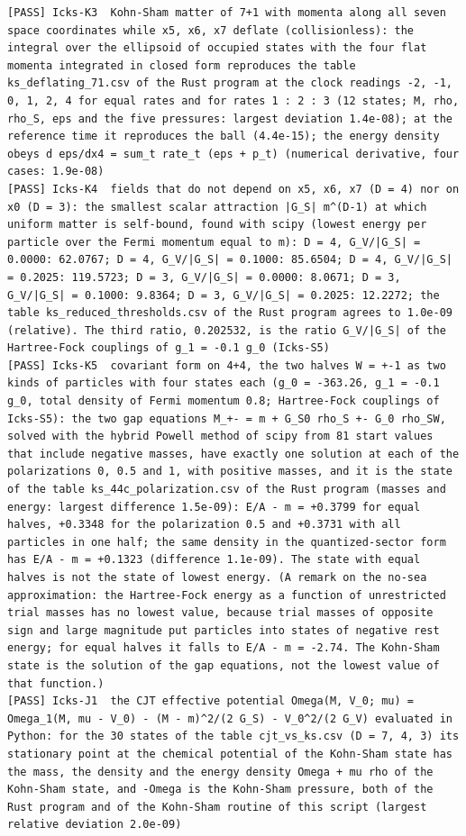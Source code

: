 \documentclass[
  10pt,
]{article}
\begin{document}
\begin{verbatim}
[PASS] Icks-K3  Kohn-Sham matter of 7+1 with momenta along all seven space coordinates while x5, x6, x7 deflate (collisionless): the integral over the ellipsoid of occupied states with the four flat momenta integrated in closed form reproduces the table ks_deflating_71.csv of the Rust program at the clock readings -2, -1, 0, 1, 2, 4 for equal rates and for rates 1 : 2 : 3 (12 states; M, rho, rho_S, eps and the five pressures: largest deviation 1.4e-08); at the reference time it reproduces the ball (4.4e-15); the energy density obeys d eps/dx4 = sum_t rate_t (eps + p_t) (numerical derivative, four cases: 1.9e-08)
[PASS] Icks-K4  fields that do not depend on x5, x6, x7 (D = 4) nor on x0 (D = 3): the smallest scalar attraction |G_S| m^(D-1) at which uniform matter is self-bound, found with scipy (lowest energy per particle over the Fermi momentum equal to m): D = 4, G_V/|G_S| = 0.0000: 62.0767; D = 4, G_V/|G_S| = 0.1000: 85.6504; D = 4, G_V/|G_S| = 0.2025: 119.5723; D = 3, G_V/|G_S| = 0.0000: 8.0671; D = 3, G_V/|G_S| = 0.1000: 9.8364; D = 3, G_V/|G_S| = 0.2025: 12.2272; the table ks_reduced_thresholds.csv of the Rust program agrees to 1.0e-09 (relative). The third ratio, 0.202532, is the ratio G_V/|G_S| of the Hartree-Fock couplings of g_1 = -0.1 g_0 (Icks-S5)
[PASS] Icks-K5  covariant form on 4+4, the two halves W = +-1 as two kinds of particles with four states each (g_0 = -363.26, g_1 = -0.1 g_0, total density of Fermi momentum 0.8; Hartree-Fock couplings of Icks-S5): the two gap equations M_+- = m + G_S0 rho_S +- G_0 rho_SW, solved with the hybrid Powell method of scipy from 81 start values that include negative masses, have exactly one solution at each of the polarizations 0, 0.5 and 1, with positive masses, and it is the state of the table ks_44c_polarization.csv of the Rust program (masses and energy: largest difference 1.5e-09): E/A - m = +0.3799 for equal halves, +0.3348 for the polarization 0.5 and +0.3731 with all particles in one half; the same density in the quantized-sector form has E/A - m = +0.1323 (difference 1.1e-09). The state with equal halves is not the state of lowest energy. (A remark on the no-sea approximation: the Hartree-Fock energy as a function of unrestricted trial masses has no lowest value, because trial masses of opposite sign and large magnitude put particles into states of negative rest energy; for equal halves it falls to E/A - m = -2.74. The Kohn-Sham state is the solution of the gap equations, not the lowest value of that function.)
[PASS] Icks-J1  the CJT effective potential Omega(M, V_0; mu) = Omega_1(M, mu - V_0) - (M - m)^2/(2 G_S) - V_0^2/(2 G_V) evaluated in Python: for the 30 states of the table cjt_vs_ks.csv (D = 7, 4, 3) its stationary point at the chemical potential of the Kohn-Sham state has the mass, the density and the energy density Omega + mu rho of the Kohn-Sham state, and -Omega is the Kohn-Sham pressure, both of the Rust program and of the Kohn-Sham routine of this script (largest relative deviation 2.0e-09)

\end{verbatim}
\end{document}
